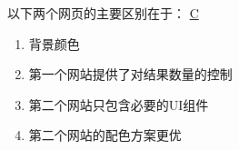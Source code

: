 \begin{problem}
	以下两个网页的主要区别在于：
	\uline{C}
    \begin{figure}[H]
        \setcounter{subfigure}{0}
        \centering
        \vspace{-1em}	
        \hfill
        \vspace{-1em}
    \end{figure}
    \vspace{-4em}
    \begin{multicols}{2}
        \begin{enumerate}[label=\Alph*.]
            \item 背景颜色
            \item 第一个网站提供了对结果数量的控制
            \item 第二个网站只包含必要的UI组件
            \item 第二个网站的配色方案更优
        \end{enumerate}
    \end{multicols}
    \vspace{-1em}
\end{problem}



